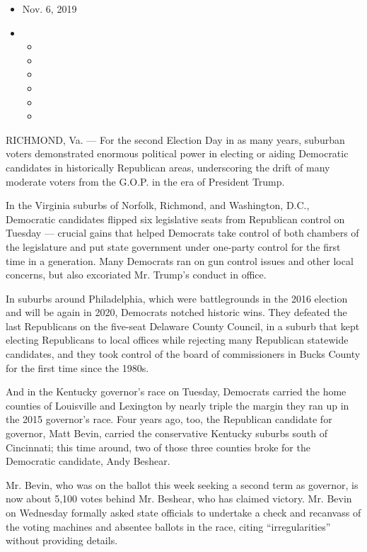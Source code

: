 \begin{itemize}
\item
  Nov. 6, 2019
\item
  \begin{itemize}
  \item
  \item
  \item
  \item
  \item
  \item
  \end{itemize}
\end{itemize}

RICHMOND, Va. --- For the second Election Day in as many years, suburban
voters demonstrated enormous political power in electing or aiding
Democratic candidates in historically Republican areas, underscoring the
drift of many moderate voters from the G.O.P. in the era of President
Trump.

In the Virginia suburbs of Norfolk, Richmond, and Washington, D.C.,
Democratic candidates flipped six legislative seats from Republican
control on Tuesday --- crucial gains that helped Democrats take control
of both chambers of the legislature and put state government under
one-party control for the first time in a generation. Many Democrats ran
on gun control issues and other local concerns, but also excoriated Mr.
Trump's conduct in office.

In suburbs around Philadelphia, which were battlegrounds in the 2016
election and will be again in 2020, Democrats notched historic wins.
They defeated the last Republicans on the five-seat Delaware County
Council, in a suburb that kept electing Republicans to local offices
while rejecting many Republican statewide candidates, and they took
control of the board of commissioners in Bucks County for the first time
since the 1980s.

And in the Kentucky governor's race on Tuesday, Democrats carried the
home counties of Louisville and Lexington by nearly triple the margin
they ran up in the 2015 governor's race. Four years ago, too, the
Republican candidate for governor, Matt Bevin, carried the conservative
Kentucky suburbs south of Cincinnati; this time around, two of those
three counties broke for the Democratic candidate, Andy Beshear.

Mr. Bevin, who was on the ballot this week seeking a second term as
governor, is now about 5,100 votes behind Mr. Beshear, who has claimed
victory. Mr. Bevin on Wednesday formally asked state officials to
undertake a check and recanvass of the voting machines and absentee
ballots in the race, citing ``irregularities'' without providing
details.

